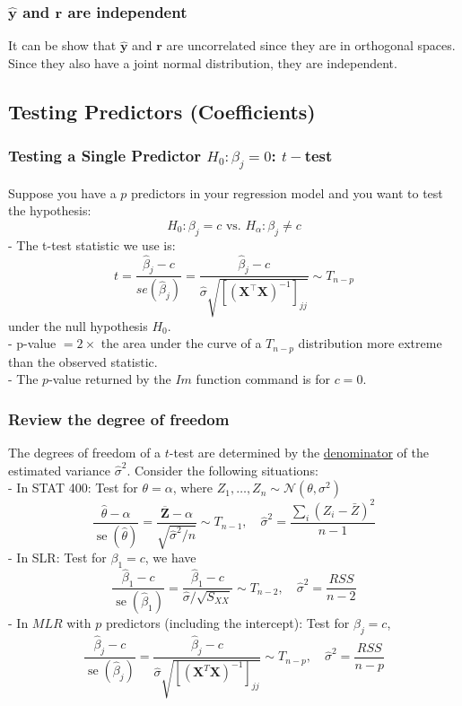 \documentclass[11pt,a4paper]{article}
\begin{document}
\subsubsection{$\hat{\mathbf{y}}$ and $\boldsymbol{r}$ are independent}
It can be show that $\hat{\mathbf{y}}$ and $\boldsymbol{r}$ are uncorrelated since they are in orthogonal spaces. Since they also have a joint normal distribution, they are independent.

\subsection{Testing Predictors (Coeﬃcients)}
\subsubsection{Testing a Single Predictor $H_0: \beta_j=0$: $t-$test}
Suppose you have a $p$ predictors in your regression model and you want to test the hypothesis:
$$
H_{0}: \beta_{j}=c \text { vs. } H_{\alpha}: \beta_{j} \neq c
$$
- The t-test statistic we use is:
$$
t=\frac{\hat{\beta}_{j}-c}{s e\left(\hat{\beta}_{j}\right)}=\frac{\hat{\beta}_{j}-c}{\hat{\sigma} \sqrt{\left[\left(\mathbf{X}^{\top} \mathbf{X}\right)^{-1}\right]_{j j}}} \sim T_{n-p}
$$
under the null hypothesis $H_{0}$.\\
- p-value $=2 \times$ the area under the curve of a $T_{n-p}$ distribution more extreme than the observed statistic.\\
- The $p$-value returned by the $I m$ function command is for $c=0$.
\subsubsection{Review the degree of freedom}
The degrees of freedom of a $t$-test are determined by the \underline{denominator} of the estimated variance $\hat{\sigma}^{2}$. Consider the following situations:\\
- In STAT 400: Test for $\theta=\alpha$, where $Z_{1}, \ldots, Z_{n} \sim \mathcal{N}\left(\theta, \sigma^{2}\right)$
$$
\frac{\hat{\theta}-\alpha}{\operatorname{se}(\hat{\theta})}=\frac{\overline{\mathbf{Z}}-\alpha}{\sqrt{\hat{\sigma}^{2} / n}} \sim T_{n-1}, \quad \hat{\sigma}^{2}=\frac{\sum_{i}\left(Z_{i}-\bar{Z}\right)^{2}}{n-1}
$$
- In SLR: Test for $\beta_{1}=c$, we have
$$
\frac{\hat{\beta}_{1}-c}{\operatorname{se}\left(\hat{\beta}_{1}\right)}=\frac{\hat{\beta}_{1}-c}{\hat{\sigma} / \sqrt{S_{X X}}} \sim T_{n-2},\quad \hat{\sigma}^{2}=\frac{R S S}{n-2}
$$
- In $M L R$ with $p$ predictors (including the intercept): Test for $\beta_{j}=c$,
$$
\frac{\hat{\beta}_{j}-c}{\operatorname{se}\left(\hat{\beta}_{j}\right)}=\frac{\hat{\beta}_{j}-c}{\hat{\sigma} \sqrt{\left[\left(\mathbf{X}^{T} \mathbf{X}\right)^{-1}\right]_{j j}}} \sim T_{n-p}, \quad\hat{\sigma}^{2}=\frac{R S S}{n-p}
$$
\end{document}
